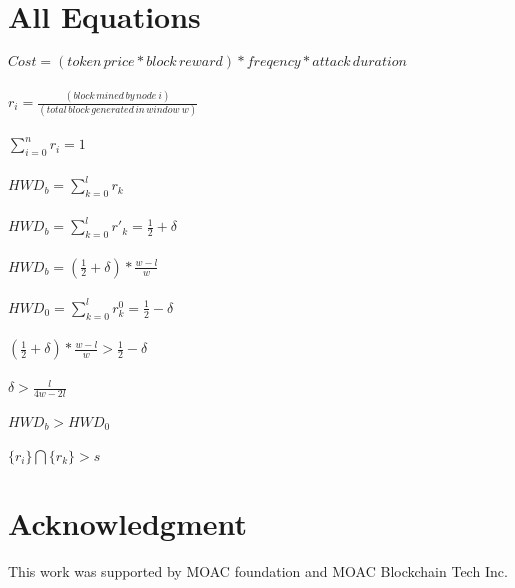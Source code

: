 \documentclass[conference]{IEEEtran}
\begin{document}
\section{All Equations}
$Cost=(token\, price*block\, reward)*freqency*attack\, duration$ \\
\\
$r_i=\frac{(block\, mined\, by\, node\ i)}{(total\, block\, generated\, in\, window\ w)}$ \\
\\
$\sum_{i=0}^{n}r_i = 1$ \\
\\
$H\!W\!D_b = \sum_{k=0}^{l}r_k$ \\
\\
$H\!W\!D_b= \sum_{k=0}^{l}r'_k=\frac{1}{2} + \delta$ \\
\\
$H\!W\!D_b= (\frac{1}{2} + \delta) * \frac{w-l}{w}$ \\
\\
$H\!W\!D_0 = \sum_{k=0}^{l} r_{k}^{0} =  \frac{1}{2} - \delta$ \\
\\
$(\frac{1}{2} + \delta) * \frac{w-l}{w} > \frac{1}{2}-\delta$ \\
\\
$\delta>\frac{l}{4w-2l}$ \\
\\
$H\!W\!D_b>H\!W\!D_0$ \\
\\
$\{r_i\}\bigcap\{r_k\}>s$ \\

\section*{Acknowledgment}

This work was supported by MOAC foundation and MOAC Blockchain Tech Inc.
\end{document}
